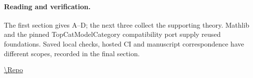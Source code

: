 \paragraph{Reading and verification.}
The first section gives A--D;
the next three collect the supporting theory.
Mathlib and the pinned TopCatModelCategory compatibility port supply reused foundations.
Saved local checks, hosted CI and manuscript correspondence have different scopes,
recorded in the final section.
\par\smallskip\noindent\url{\Repo}
